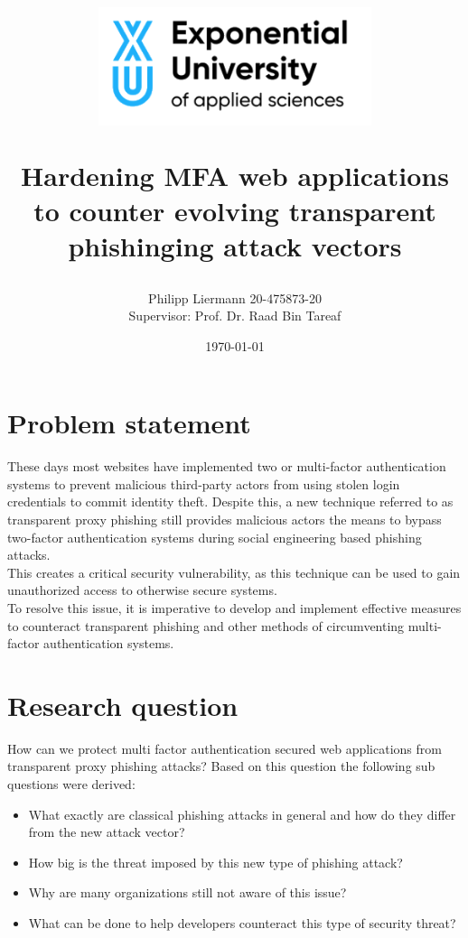 \documentclass[12pt]{scrbook}
\begin{document}
\author{Philipp Liermann 20-475873-20\\Supervisor: Prof. Dr. Raad Bin Tareaf}
\date{\today}

\title{ \begin{center} \includegraphics[width=8cm]{./images/logo.png}
  \end{center} \vspace{2cm} Hardening MFA web applications to counter evolving
transparent phishinging attack vectors \vspace{2cm} \large }

\maketitle

\newpage \tableofcontents

\newpage \section{Problem statement} These days most websites have implemented
two or multi-factor authentication systems to prevent malicious third-party
actors from using stolen login credentials to commit identity theft. Despite
this, a new technique referred to as transparent proxy phishing still provides
malicious actors the means to bypass two-factor authentication systems during
social engineering based phishing attacks.\\This creates a critical security
vulnerability, as this technique can be used to gain unauthorized access to
otherwise secure systems.\\To resolve this issue, it is imperative to develop
and implement effective measures to counteract transparent phishing and other
methods of circumventing multi-factor authentication systems.

\section{Research question} How can we protect multi factor authentication
secured web applications from transparent proxy phishing attacks? Based on this
question the following sub questions were derived: \begin{itemize} \item What
  exactly are classical phishing attacks in general and how do they differ from
  the new attack vector?
  \item How big is the threat imposed by this new type of phishing attack?
  \item Why are many organizations still not aware of this issue?
  \item What can be done to help developers counteract this type of security
    threat?
\end{itemize}
\end{document}
